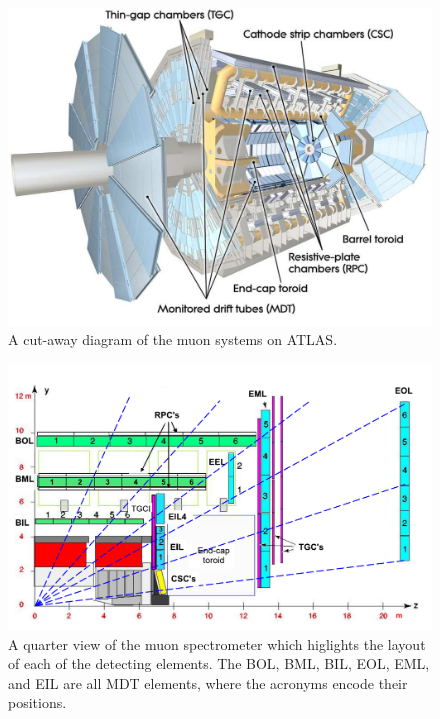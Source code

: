 \begin{figure}[hbtp]
\includegraphics[width=\fullfig]{figures/muon_overview.pdf}
\caption{A cut-away diagram of the muon systems on \ac{ATLAS}.}
\label{fig:muon_overview}
\end{figure}

\begin{figure}[hbtp]
\includegraphics[width=\fullfig]{figures/muon_side_schematic.pdf}
\caption{A quarter view of the muon spectrometer which higlights the layout of each of the detecting elements. The BOL, BML, BIL, EOL, EML, and EIL are all \ac{MDT} elements, where the acronyms encode their positions.}
\label{fig:muon_side_schematic}
\end{figure}

